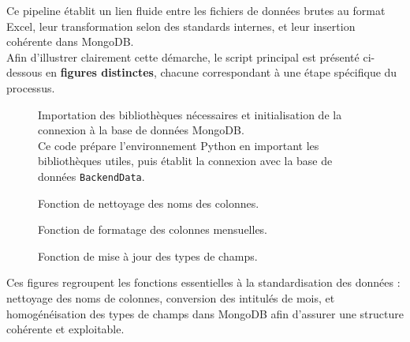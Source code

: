 \documentclass[a4paper,11pt]{report}
\begin{document}
\vspace{1em}
Ce pipeline établit un lien fluide entre les fichiers de données brutes au format Excel, leur transformation selon des standards internes, et leur insertion cohérente dans MongoDB.\\

Afin d’illustrer clairement cette démarche, le script principal est présenté ci-dessous en \textbf{figures distinctes}, chacune correspondant à une étape spécifique du processus. 

\begin{figure}[htbp]
  \centering
  \caption{Importation des bibliothèques nécessaires et initialisation de la connexion à la base de données MongoDB.\\
   Ce code prépare l’environnement Python en important les bibliothèques utiles, puis établit la connexion avec la base de données \texttt{BackendData}.}
  \label{fig:import-mongo}
\end{figure}
\begin{figure}[H]
  \centering
  \setlength{\fboxrule}{1pt}
  \setlength{\fboxsep}{3pt}
  \caption{Fonction de nettoyage des noms des colonnes.}
  \label{fig:clean-columns}
\end{figure}

\begin{figure}[H]
  \centering
  \setlength{\fboxrule}{1pt}
  \setlength{\fboxsep}{3pt}
  \caption{Fonction de formatage des colonnes mensuelles.}
  \label{fig:format-months}
\end{figure}

\begin{figure}[H]
  \centering
  \setlength{\fboxrule}{1pt}
  \setlength{\fboxsep}{3pt}
  \caption{Fonction de mise à jour des types de champs.}
  \label{fig:update-types}
\end{figure}

\FloatBarrier

Ces figures regroupent les fonctions essentielles à la standardisation des données : nettoyage des noms de colonnes, conversion des intitulés de mois, et homogénéisation des types de champs dans MongoDB afin d’assurer une structure cohérente et exploitable.
\end{document}

